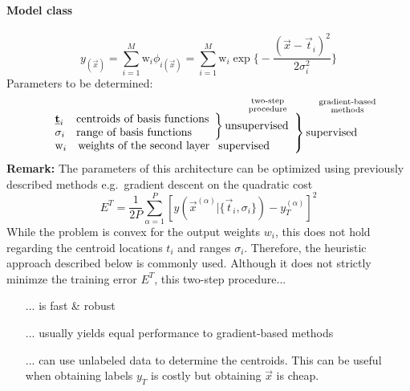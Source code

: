 \paragraph{Model class}
\begin{equation}
	y_{(\vec{x})} = \sum\limits_{i=1}^M \mathrm{w}_i \phi_{i(\vec{x})} = \sum_{i = 1}^M \mathrm{w}_i \exp
		\bigg\{ -\frac{(\vec{x} - \vec{t}_i)^2}{2 \sigma_i^2} \bigg\}
\end{equation}
Parameters to be determined:
$$
\begin{array} {ll}
	\hspace{6.5cm} \substack{\text{two-step} \\ \text{procedure}} 
	\hspace{1cm} \substack{\text{gradient-based} \\ \text{methods}} \\
	\left.
	\begin{array}{ll}
		\left. 
		\begin{array} {ll}
			\vec{t}_i & \text{centroids of basis functions} \\
			\sigma_i & \text{range of basis functions}
		\end{array}
		\right \} \text{unsupervised} \\
		\left.
		\begin{array} {ll}
			\mathrm{w}_i & \text{weights of the second layer}
		\end{array}
		\right. \text{supervised}
	\end{array}
	\right \} \text{supervised}
\end{array}
$$
\textbf{Remark:} The parameters of this architecture can be optimized
using previously described methods e.g.\ gradient descent on the
quadratic cost
$$E^T = \frac{1}{2P} \sum_{\alpha=1}^P[y(\vec{x}^{(\alpha)}|\{\vec{t}_i,\sigma_i\})
-y_T^{(\alpha)}]^2$$ While the problem is convex for the output
weights $w_i$, this does not hold regarding the centroid locations $t_i$
and ranges $\sigma_i$. Therefore, the heuristic approach described
below is commonly used. Although it does not strictly minimze the
training error $E^T$, this two-step procedure...
\begin{itemize}
\item[...] is fast \& robust
\item[...] usually yields equal performance to gradient-based methods
\item[...] can use unlabeled data to determine the centroids. This can be useful when obtaining labels $y_T$ is costly but obtaining $\vec{x}$ is cheap.
\end{itemize}

